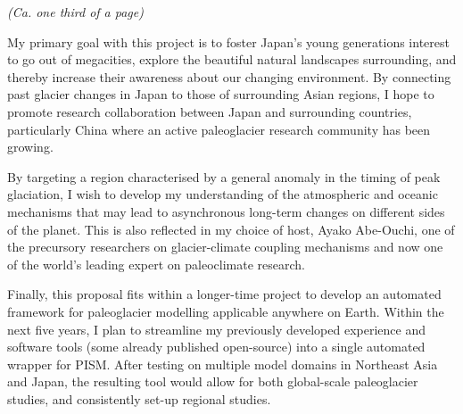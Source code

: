 \documentclass{article}
\begin{document}
    \emph{(Ca. one third of a page)}

    My primary goal with this project is to foster Japan's young generations
    interest to go out of megacities, explore the beautiful natural landscapes
    surrounding, and thereby increase their awareness about our changing
    environment. By connecting past glacier changes in Japan to those of
    surrounding Asian regions, I hope to promote research collaboration between
    Japan and surrounding countries, particularly China where an active
    paleoglacier research community has been growing.

    By targeting a region characterised by a general anomaly in the timing of
    peak glaciation, I wish to develop my understanding of the atmospheric and
    oceanic mechanisms that may lead to asynchronous long-term changes on
    different sides of the planet. This is also reflected in my choice of host,
    Ayako Abe-Ouchi, one of the precursory researchers on glacier-climate
    coupling mechanisms and now one of the world's leading expert on
    paleoclimate research.

    Finally, this proposal fits within a longer-time project to develop an
    automated framework for paleoglacier modelling applicable anywhere on
    Earth. Within the next five years, I plan to streamline my previously
    developed experience and software tools (some already published
    open-source) into a single automated wrapper for PISM. After testing on
    multiple model domains in Northeast Asia and Japan, the resulting
    tool would allow for both global-scale paleoglacier studies, and
    consistently set-up regional studies.


\end{document}
